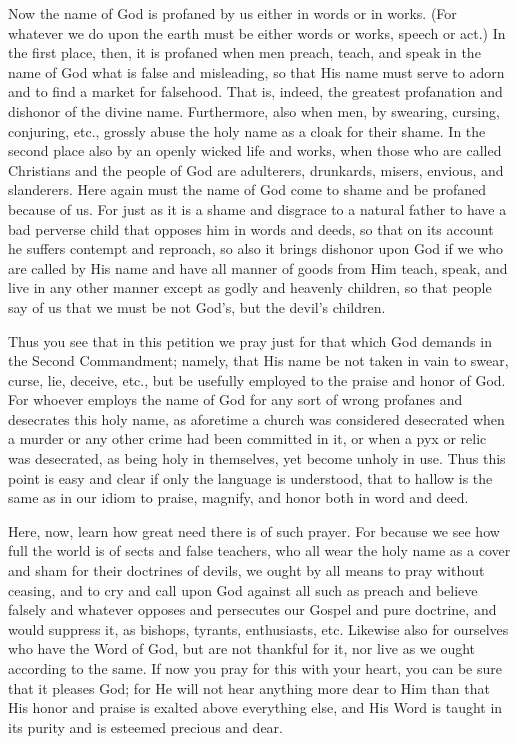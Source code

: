 Now the name of God is profaned by us either in words or in works. (For
whatever we do upon the earth must be either words or works, speech or
act.) In the first place, then, it is profaned when men preach, teach,
and speak in the name of God what is false and misleading, so that His
name must serve to adorn and to find a market for falsehood. That is,
indeed, the greatest profanation and dishonor of the divine name.
Furthermore, also when men, by swearing, cursing, conjuring, etc.,
grossly abuse the holy name as a cloak for their shame. In the second
place also by an openly wicked life and works, when those who are
called Christians and the people of God are adulterers, drunkards,
misers, envious, and slanderers. Here again must the name of God come
to shame and be profaned because of us. For just as it is a shame and
disgrace to a natural father to have a bad perverse child that opposes
him in words and deeds, so that on its account he suffers contempt and
reproach, so also it brings dishonor upon God if we who are called by
His name and have all manner of goods from Him teach, speak, and live
in any other manner except as godly and heavenly children, so that
people say of us that we must be not God's, but the devil's children.

Thus you see that in this petition we pray just for that which God
demands in the Second Commandment; namely, that His name be not taken
in vain to swear, curse, lie, deceive, etc., but be usefully employed
to the praise and honor of God. For whoever employs the name of God for
any sort of wrong profanes and desecrates this holy name, as aforetime
a church was considered desecrated when a murder or any other crime had
been committed in it, or when a pyx or relic was desecrated, as being
holy in themselves, yet become unholy in use. Thus this point is easy
and clear if only the language is understood, that to hallow is the
same as in our idiom to praise, magnify, and honor both in word and
deed.

Here, now, learn how great need there is of such prayer. For because we
see how full the world is of sects and false teachers, who all wear the
holy name as a cover and sham for their doctrines of devils, we ought
by all means to pray without ceasing, and to cry and call upon God
against all such as preach and believe falsely and whatever opposes and
persecutes our Gospel and pure doctrine, and would suppress it, as
bishops, tyrants, enthusiasts, etc. Likewise also for ourselves who
have the Word of God, but are not thankful for it, nor live as we
ought according to the same. If now you pray for this with your heart,
you can be sure that it pleases God; for He will not hear anything more
dear to Him than that His honor and praise is exalted above everything
else, and His Word is taught in its purity and is esteemed precious and
dear.

